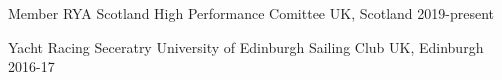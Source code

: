 

\begin{cvhonors}
  \cvhonor
    {Member} %
    {RYA Scotland High Performance Comittee} %
    {UK, Scotland} %
    {2019-present} %

  \cvhonor
    {Yacht Racing Seceratry} %
    {University of Edinburgh Sailing Club} %
    {UK, Edinburgh} %
    {2016-17} %

\end{cvhonors}
